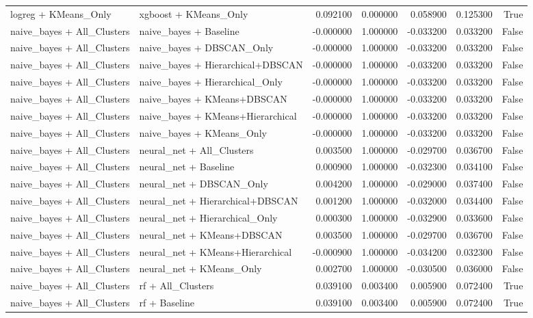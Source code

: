 \begin{tabular}{llrrrrr}
logreg + KMeans_Only & xgboost + KMeans_Only & 0.092100 & 0.000000 & 0.058900 & 0.125300 & True \\
naive_bayes + All_Clusters & naive_bayes + Baseline & -0.000000 & 1.000000 & -0.033200 & 0.033200 & False \\
naive_bayes + All_Clusters & naive_bayes + DBSCAN_Only & -0.000000 & 1.000000 & -0.033200 & 0.033200 & False \\
naive_bayes + All_Clusters & naive_bayes + Hierarchical+DBSCAN & -0.000000 & 1.000000 & -0.033200 & 0.033200 & False \\
naive_bayes + All_Clusters & naive_bayes + Hierarchical_Only & -0.000000 & 1.000000 & -0.033200 & 0.033200 & False \\
naive_bayes + All_Clusters & naive_bayes + KMeans+DBSCAN & -0.000000 & 1.000000 & -0.033200 & 0.033200 & False \\
naive_bayes + All_Clusters & naive_bayes + KMeans+Hierarchical & -0.000000 & 1.000000 & -0.033200 & 0.033200 & False \\
naive_bayes + All_Clusters & naive_bayes + KMeans_Only & -0.000000 & 1.000000 & -0.033200 & 0.033200 & False \\
naive_bayes + All_Clusters & neural_net + All_Clusters & 0.003500 & 1.000000 & -0.029700 & 0.036700 & False \\
naive_bayes + All_Clusters & neural_net + Baseline & 0.000900 & 1.000000 & -0.032300 & 0.034100 & False \\
naive_bayes + All_Clusters & neural_net + DBSCAN_Only & 0.004200 & 1.000000 & -0.029000 & 0.037400 & False \\
naive_bayes + All_Clusters & neural_net + Hierarchical+DBSCAN & 0.001200 & 1.000000 & -0.032000 & 0.034400 & False \\
naive_bayes + All_Clusters & neural_net + Hierarchical_Only & 0.000300 & 1.000000 & -0.032900 & 0.033600 & False \\
naive_bayes + All_Clusters & neural_net + KMeans+DBSCAN & 0.003500 & 1.000000 & -0.029700 & 0.036700 & False \\
naive_bayes + All_Clusters & neural_net + KMeans+Hierarchical & -0.000900 & 1.000000 & -0.034200 & 0.032300 & False \\
naive_bayes + All_Clusters & neural_net + KMeans_Only & 0.002700 & 1.000000 & -0.030500 & 0.036000 & False \\
naive_bayes + All_Clusters & rf + All_Clusters & 0.039100 & 0.003400 & 0.005900 & 0.072400 & True \\
naive_bayes + All_Clusters & rf + Baseline & 0.039100 & 0.003400 & 0.005900 & 0.072400 & True \\

\end{tabular}
